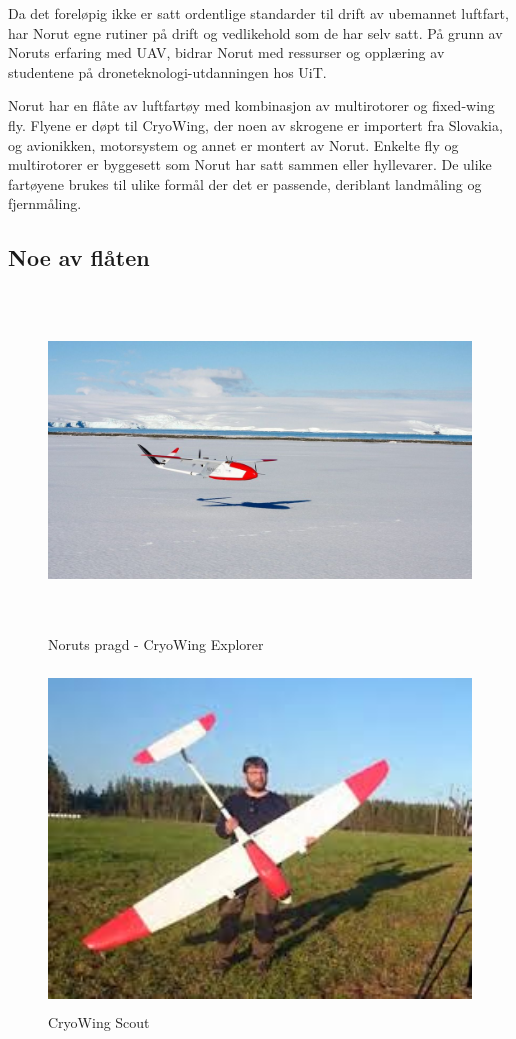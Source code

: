 \documentclass[12pt, a4paper]{article}
\begin{document}
Da det foreløpig ikke er satt ordentlige standarder til drift av ubemannet luftfart, har Norut egne rutiner på drift og vedlikehold som de har selv satt. På grunn av Noruts erfaring med UAV, bidrar Norut med ressurser og opplæring av studentene på droneteknologi-utdanningen hos UiT. 

Norut har en flåte av luftfartøy med kombinasjon av multirotorer og fixed-wing fly. Flyene er døpt til CryoWing, der noen av skrogene er importert fra Slovakia, og avionikken, motorsystem og annet er montert av Norut. Enkelte fly og multirotorer er byggesett som Norut har satt sammen eller hyllevarer. De ulike fartøyene brukes til ulike formål der det er passende, deriblant landmåling og fjernmåling.\\
\newpage

\subsection{Noe av flåten}
\begin{figure}[hpbt]
	\centering
	\includegraphics[width=.6\textwidth, height=9cm]{bilder/CryoWing_Explorer.jpeg}
	\caption[CryoWing Explorer]{Noruts pragd - CryoWing Explorer}
\end{figure}

\begin{figure}[h!]
	\centering
	\includegraphics[width=.6\textwidth, height=9cm]{bilder/CryoWing_Scout.jpeg}
	\caption{CryoWing Scout}
\end{figure}
\end{document}
